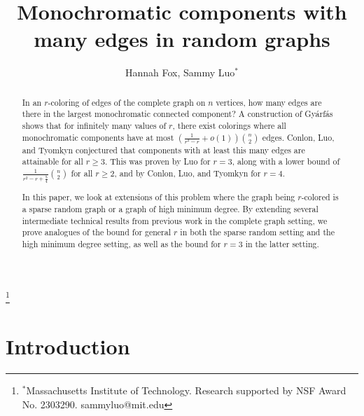 \documentclass[12pt]{amsart}
\theoremstyle{definition}
\numberwithin{equation}{section}
\begin{document}
	
	\mbox{}
	\title{Monochromatic components with many edges in random graphs}

	
	\author{Hannah Fox, Sammy Luo$^*$}
    \thanks{$^*$Massachusetts Institute of Technology. Research supported by NSF Award No. 2303290. sammyluo@mit.edu}

	\begin{abstract}
		In an $r$-coloring of edges of the complete graph on $n$ vertices, how many edges are there in the largest monochromatic connected component? A construction of Gyárfás shows that for infinitely many values of $r$, there exist colorings where all monochromatic components have at most $\left(\frac{1}{r^2-r}+o(1)\right)\binom{n}{2}$ edges. Conlon, Luo, and Tyomkyn conjectured that components with at least this many edges are attainable for all $r \ge 3$. This was proven by Luo for $r=3$, along with a lower bound of $\frac{1}{r^2-r+\frac54}{n\choose 2}$
		for all $r\ge 2$, and by Conlon, Luo, and Tyomkyn for $r=4$.
  
		In this paper, we look at extensions of this problem where the graph being $r$-colored is a sparse random graph or a graph of high minimum degree. By extending several intermediate technical results from previous work in the complete graph setting, we prove analogues of the bound for general $r$ in both the sparse random setting and the high minimum degree setting, as well as the bound for $r=3$ in the latter setting.
	\end{abstract}
	\medskip

	\maketitle










\bigskip


\section{Introduction}
\label{sec:intro}

\end{document}
